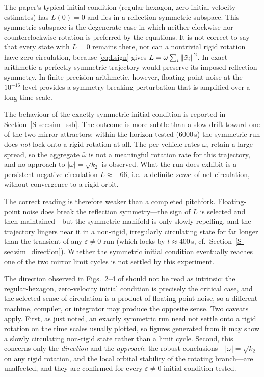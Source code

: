 The paper's typical initial condition (regular hexagon, zero initial velocity estimates) has
$L(0)=0$ and lies in a reflection-symmetric subspace. This symmetric subspace is the degenerate case
in which neither clockwise nor counterclockwise rotation is preferred by the equations. It is not
correct to say that every state with $L=0$ remains there, nor can a nontrivial rigid rotation have
zero circulation, because \eqref{eq:Lsign} gives $L=\omega\sum_i\left\| \tilde{x}_i \right\|^2$. In exact arithmetic
a perfectly symmetric trajectory would preserve its imposed reflection symmetry. In finite-precision
arithmetic, however, floating-point noise at the $10^{-16}$ level provides a symmetry-breaking
perturbation that is amplified over a long time scale.

The behaviour of the exactly symmetric initial condition is reported in
Section~\ref{S-sec:sim_ssb}. The outcome is more subtle than a slow drift toward one of the two mirror
attractors: within the horizon tested ($6000$\,s) the symmetric run does \emph{not} lock onto a rigid
rotation at all. The per-vehicle rates $\omega_i$ retain a large spread, so the aggregate
$\bar\omega$ is not a meaningful rotation rate for this trajectory, and no approach to
$|\omega|=\sqrt{k_2}$ is observed. What the run does exhibit is a persistent negative circulation
$L\approx-66$, i.e.\ a definite \emph{sense} of net circulation, without convergence to a rigid
orbit.

The correct reading is therefore weaker than a completed pitchfork. Floating-point noise does break
the reflection symmetry---the sign of $L$ is selected and then maintained---but the symmetric
manifold is only slowly repelling, and the trajectory lingers near it in a non-rigid, irregularly
circulating state for far longer than the transient of any $\varepsilon\ne0$ run
(which locks by $t\approx400$\,s, cf.\ Section~\ref{S-sec:sim_direction}). Whether the symmetric initial
condition eventually reaches one of the two mirror limit cycles is not settled by this experiment.

\begin{remark}
The direction observed in Figs.~2--4 of \cite{kou2022cooperative} should not be read as intrinsic:
the regular-hexagon, zero-velocity initial condition is precisely the critical case, and the
selected sense of circulation is a product of floating-point noise, so a different machine,
compiler, or integrator may produce the opposite sense. Two caveats apply. First, as just noted, an
exactly symmetric run need not settle onto a rigid rotation on the time scales usually plotted, so
figures generated from it may show a slowly circulating non-rigid state rather than a limit cycle.
Second, this concerns only the \emph{direction} and the \emph{approach}: the robust
conclusions---$|\omega|=\sqrt{k_2}$ on any rigid rotation, and the local orbital stability of the
rotating branch---are unaffected, and they are confirmed for every $\varepsilon\ne0$ initial
condition tested.
\end{remark}

